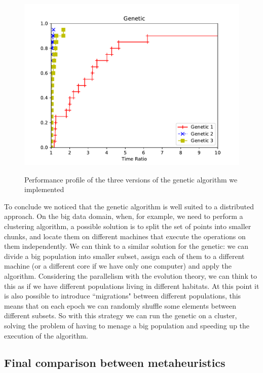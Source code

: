 \begin{figure}[h!]
\centering
	\includegraphics[scale=0.9]{media/genetic.pdf} \\
	\caption{Performance profile of the three versions of the genetic algorithm we implemented}
	\label{fig:geneticPP}
\end{figure}

\noindent To conclude we noticed that the genetic algorithm is well suited to a distributed approach. On the big data domain, when, for example, we need to perform a clustering algorithm, a possible solution is to split the set of points into smaller chunks, and locate them on different machines that execute the operations on them independently. We can think to a similar solution for the genetic: we can divide a big population into smaller subset, assign each of them to a different machine (or a different core if we have only one computer) and apply the algorithm. Considering the parallelism with the evolution theory, we can think to this as if we have different populations living in different habitats. At this point it is also possible to introduce ``migrations" between different populations, this means that on each epoch we can randomly shuffle some elements between different subsets. 
So with this strategy we can run the genetic on a cluster, solving the problem of having to menage a big population and speeding up the execution of the algorithm.


\subsection{Final comparison between metaheuristics}

